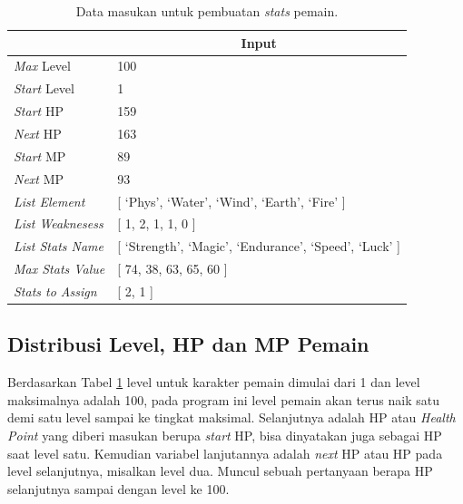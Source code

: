 \begin{table}[!h]
	\centering
	\caption{Data masukan untuk pembuatan \textit{stats} pemain.}
	\label{tb:player_input_variable}
	\begin{tabular}{|l|l|}
		\hline
		\rowcolor[HTML]{9B9B9B} 
		\multicolumn{1}{|c|}{\cellcolor[HTML]{9B9B9B}\textbf{Variabel}} & \multicolumn{1}{c|}{\cellcolor[HTML]{9B9B9B}\textbf{Input}} \\ \hline
		\textit{Max} Level & 100 \\ \hline
		\textit{Start} Level & 1 \\ \hline
		\textit{Start} HP & 159 \\ \hline
		\textit{Next} HP & 163 \\ \hline
		\textit{Start} MP & 89 \\ \hline
		\textit{Next} MP & 93 \\ \hline
		\textit{List Element} & {[} `Phys', `Water', `Wind', `Earth', `Fire' {]} \\ \hline
		\textit{List Weaknesess} & {[} 1, 2, 1, 1, 0 {]} \\ \hline
		\textit{List Stats Name} & {[} `Strength', `Magic', `Endurance', `Speed', `Luck' {]} \\ \hline
		\textit{Max Stats Value} & {[} 74, 38, 63, 65, 60 {]} \\ \hline
		\textit{Stats to Assign} & {[} 2, 1 {]} \\ \hline
	\end{tabular}
\end{table}
\vspace{1ex}

\subsection{Distribusi Level, HP dan MP Pemain}
\label{sec:sub_sec3_player_level_hp_mp}
\vspace{1ex}

Berdasarkan Tabel \ref{tb:player_input_variable} level untuk karakter pemain dimulai dari 1 dan level maksimalnya adalah 100, pada program ini level pemain akan terus naik satu demi satu level sampai ke tingkat maksimal. Selanjutnya adalah HP atau \textit{Health Point} yang diberi masukan berupa \textit{start} HP, bisa dinyatakan juga sebagai HP saat level satu. Kemudian variabel lanjutannya adalah \textit{next} HP atau HP pada level selanjutnya, misalkan level dua. Muncul sebuah pertanyaan berapa HP selanjutnya sampai dengan level ke 100. 
\vspace{1ex}

